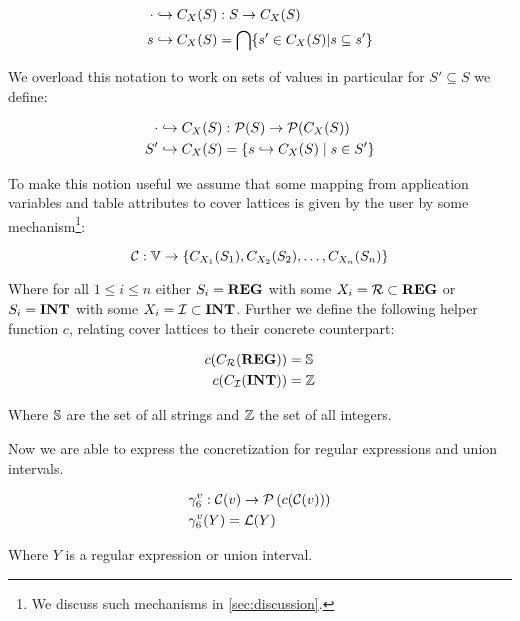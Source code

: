 \begin{align}
    \cdot \hookrightarrow C_X(S) &: S\rightarrow C_X(S) \\
    s \hookrightarrow C_X(S) &= \bigcap\{s' \in C_X(S)|s \subseteq s'\}
\end{align}

We overload this notation to work on sets of values in particular for $S' \subseteq S$ we define:

\begin{align}
    \cdot \hookrightarrow C_X(S) &: \mathcal{P}(S) \rightarrow \mathcal{P}(C_X(S)) \\
    S' \hookrightarrow C_X (S) &= \{s \hookrightarrow C_X(S) \mid s \in S'\}
\end{align}

To make this notion useful we assume that some mapping from application variables and table attributes to cover lattices is given by the user by some mechanism\footnote{We discuss such mechanisms in \autoref{sec:discussion}.}:

\begin{equation}\label{eq:lookupcl}
    \lookupcl : \mathbb{V} \rightarrow \{ C_{X_1}(S_1), C_{X_2}(S_2), \dots, C_{X_n}(S_n) \}
\end{equation}


Where for all $1 \leq i \leq n$ either $S_i = \mathbf{REG}$ with some $X_i = \mathcal{R} \subset \mathbf{REG}$ or $S_i = \mathbf{INT}$ with some $X_i = \mathcal{I} \subset \mathbf{INT}$.
Further we define the following helper function $c$, relating cover lattices to their concrete counterpart:


\begin{align}
    c(C_{\mathcal{R}}(\mathbf{REG})) &= \mathbb{S} \\
    c(C_{\mathcal{I}}(\mathbf{INT})) &= \mathbb{Z}
\end{align}


Where $\mathbb{S}$ are the set of all strings and $\mathbb{Z}$ the set of all integers.

Now we are able to express the concretization for regular expressions and union intervals.

\begin{align}
    &\gamma^v_6 : \mathcal{C}(v) \rightarrow \mathcal{P}\left(c(\mathcal{C}(v))\right) \\
    &\gamma^v_6(Y) = \mathcal{L}(Y)
\end{align}

Where $Y$ is a regular expression or union interval.

%

